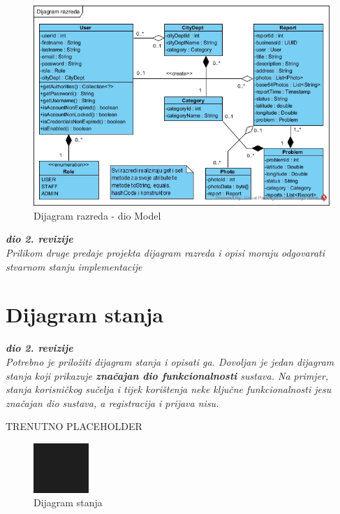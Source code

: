 \begin{figure}[H]
	\includegraphics[scale=0.60]{slike/DR-model.jpg} %
	\centering
	\caption{Dijagram razreda - dio Model}
	\label{fig:DijagramRazredaModel}
\end{figure}


\textbf{\textit{dio 2. revizije}}\\

\textit{Prilikom druge predaje projekta dijagram razreda i opisi moraju odgovarati stvarnom stanju implementacije}



\eject

\section{Dijagram stanja}


\textbf{\textit{dio 2. revizije}}\\

\textit{Potrebno je priložiti dijagram stanja i opisati ga. Dovoljan je jedan dijagram stanja koji prikazuje \textbf{značajan dio funkcionalnosti} sustava. Na primjer, stanja korisničkog sučelja i tijek korištenja neke ključne funkcionalnosti jesu značajan dio sustava, a registracija i prijava nisu. }

TRENUTNO PLACEHOLDER

\begin{figure}[H]
	\includegraphics[scale=0.60]{slike/DS.jpg} %
	\centering
	\caption{Dijagram stanja}
	\label{fig:DijagramStanja}
\end{figure}

